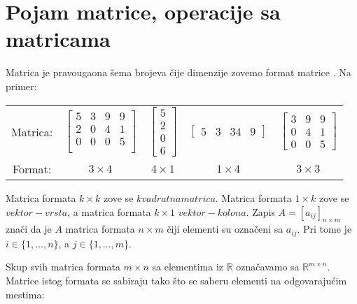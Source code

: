 \documentclass[11pt]{article}
\theoremstyle{masulthm}
\theoremstyle{masuldef}
\theoremstyle{masulexmp}
\newcommand{\R}{\mathbb{R}}
\begin{document}
\section{Pojam matrice, operacije sa matricama}

Matrica je pravougaona šema brojeva čije dimenzije zovemo
format matrice \cite{klein}. Na primer:

\begin{tabular}{ccccc}
    Matrica: &
    
    $
    \left[\begin{array}{cccc}
    5 & 3 & 9 & 9 \\
    2 & 0 & 4 & 1 \\
    0 & 0 & 0 & 5 \\
    \end{array}\right]
    $ &
    
    $
    \left[\begin{array}{cccc}
    5 \\ 2 \\ 0 \\ 6
    \end{array}\right]
    $ &
    
    $
    \left[\begin{array}{cccc}
    5 & 3 & 34 & 9
    \end{array}\right]
    $ &
    
    $
    \left[\begin{array}{cccc}
    3 & 9 & 9 \\
    0 & 4 & 1 \\
    0 & 0 & 5
    \end{array}\right]
    $ \\

    Format: &
    $ 3 \times 4 $ &
    $ 4 \times 1 $ &
    $ 1 \times 4 $ &
    $ 3 \times 3 $
\end{tabular}

Matrica formata $ k \times k $ zove se $ kvadratna matrica $.
Matrica formata $ 1 \times k $ zove se $ vektor-vrsta $,
a matrica formata $ k \times 1 $ $ vektor-kolona $. Zapis
$ A = [a_{ij}]_{n \times m} $ znači da je $ A $ matrica formata
$ n \times m $ čiji elementi su označeni sa $ a_{ij} $. Pri
tome je $ i \in \{1, \dots, n\} $, a $ j \in \{1, \dots, m\} $.

Skup svih matrica formata $ m \times n $ sa elementima iz $ \R $
označavamo sa $ \R^{m \times n} $. Matrice istog formata se sabiraju tako što se saberu elementi na odgovarajućim mestima:
\end{document}
